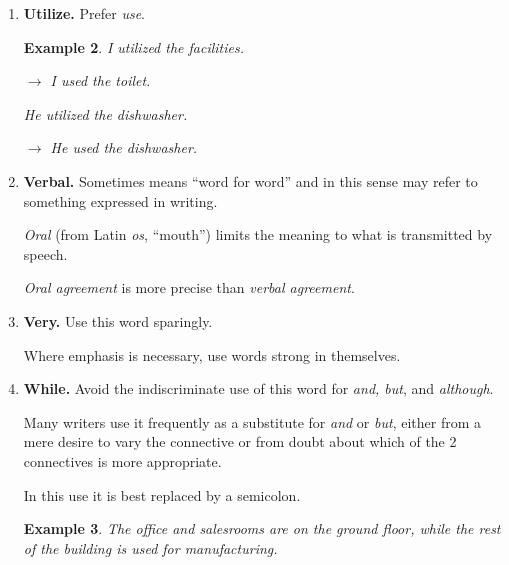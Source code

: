 \documentclass{article}
\newtheorem{example}{Example}
\begin{document}
\begin{enumerate}
	Hence, there can be no degrees of uniqueness.
	\begin{example}
		It was the most unique coffee maker on the market.
		
		$\to$ It was a unique coffee maker.
		
		The balancing act was very unique.
		
		$\to$ The balancing act was unique.
		
		Of all the spiders, the one that lives in a bubble under water is the most unique.
		
		$\to$ Among spiders, the one that lives in a bubble under water is unique.
	\end{example}
	\item {\bf Utilize.} Prefer {\it use}.
	\begin{example}
		I utilized the facilities.
		
		$\to$ I used the toilet.
		
		He utilized the dishwasher.
		
		$\to$ He used the dishwasher.
	\end{example}
	\item {\bf Verbal.} Sometimes means ``word for word'' and in this sense may refer to something expressed in writing.
	
	{\it Oral} (from Latin {\it os}, ``mouth'') limits the meaning to what is transmitted by speech.
	
	{\it Oral agreement} is more precise than {\it verbal agreement}.
	\item {\bf Very.} Use this word sparingly.
	
	Where emphasis is necessary, use words strong in themselves.
	\item {\bf While.} Avoid the indiscriminate use of this word for {\it and, but}, and {\it although}.
	
	Many writers use it frequently as a substitute for {\it and} or {\it but}, either from a mere desire to vary the connective or from doubt about which of the 2 connectives is more appropriate.
	
	In this use it is best replaced by a semicolon.
	\begin{example}
		The office and salesrooms are on the ground floor, while the rest of the building is used for manufacturing.
		

\end{example}
\end{enumerate}
\end{document}
